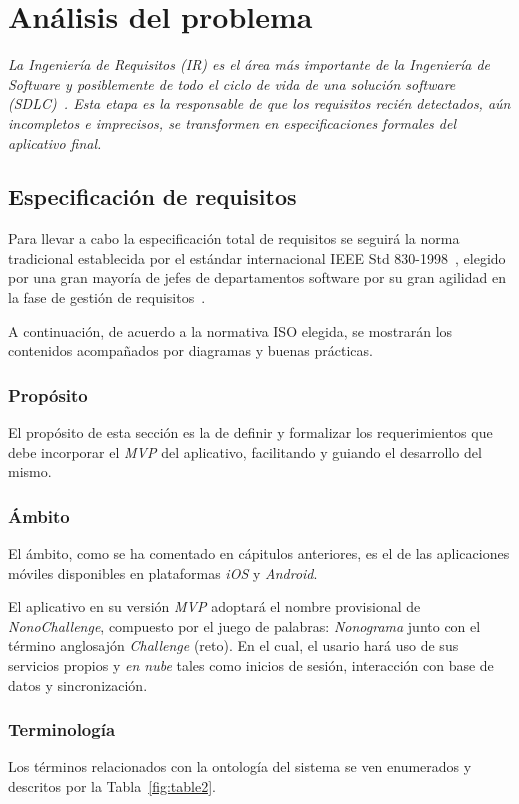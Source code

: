 \chapter{Análisis del problema}
\textit{La Ingeniería de Requisitos (IR) es el área más importante de la Ingeniería de Software y posiblemente de todo el 
ciclo de vida de una solución software (SDLC)~\cite{chakraboty2012requirements}. Esta etapa es la responsable de que los 
requisitos recién detectados, aún incompletos e imprecisos, se transformen en especificaciones formales del aplicativo final.}

\section{Especificación de requisitos}
Para llevar a cabo la especificación total de requisitos se seguirá la norma tradicional establecida por el estándar internacional 
IEEE Std 830-1998~\cite{8559686}, elegido por una gran mayoría de jefes de departamentos software por su gran agilidad en la fase de gestión 
de requisitos~\cite{guzman2018impacto}.

A continuación, de acuerdo a la normativa ISO elegida, se mostrarán los contenidos acompañados por diagramas y buenas prácticas.

\subsection{Propósito}
El propósito de esta sección es la de definir y formalizar los requerimientos que debe incorporar el \textit{MVP} del aplicativo, facilitando
y guiando el desarrollo del mismo.

\subsection{Ámbito}
El ámbito, como se ha comentado en cápitulos anteriores, es el de las aplicaciones móviles disponibles en plataformas \textit{iOS} y 
\textit{Android}.

El aplicativo en su versión \textit{MVP} adoptará el nombre provisional de \textit{NonoChallenge}, compuesto por el juego de palabras:
 \textit{Nonograma} junto con el término anglosajón \textit{Challenge} (reto).
En el cual, el usario hará uso de sus servicios propios y \textit{en nube} tales como inicios de sesión, interacción con base de datos y
sincronización.

\subsection{Terminología}
Los términos relacionados con la ontología del sistema se ven enumerados y descritos por la Tabla~\ref{fig:table2}.

